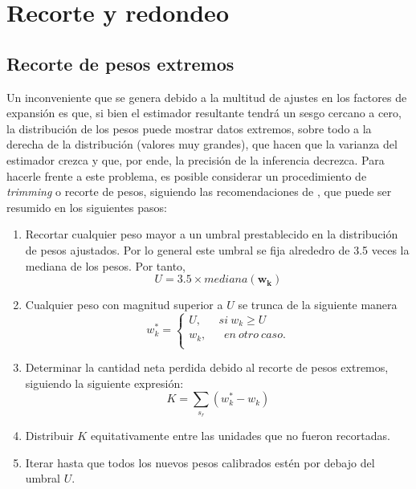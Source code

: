 \documentclass[
  12pt,
  spanish,
]{book}
\providecommand{\tightlist}{%
  \setlength{\itemsep}{0pt}\setlength{\parskip}{0pt}}
\begin{document}
\hypertarget{recorte-y-redondeo}{%
\section{Recorte y redondeo}\label{recorte-y-redondeo}}

\hypertarget{recorte-de-pesos-extremos}{%
\subsection{Recorte de pesos extremos}\label{recorte-de-pesos-extremos}}

Un inconveniente que se genera debido a la multitud de ajustes en los factores de expansión es que, si bien el estimador resultante tendrá un sesgo cercano a cero, la distribución de los pesos puede mostrar datos extremos, sobre todo a la derecha de la distribución (valores muy grandes), que hacen que la varianza del estimador crezca y que, por ende, la precisión de la inferencia decrezca. Para hacerle frente a este problema, es posible considerar un procedimiento de \emph{trimming} o recorte de pesos, siguiendo las recomendaciones de \citet[sec.~14.4]{Valliant_Dever_Kreuter_2018}, que puede ser resumido en los siguientes pasos:

\begin{enumerate}
\def\labelenumi{\arabic{enumi}.}
\tightlist
\item
  Recortar cualquier peso mayor a un umbral prestablecido en la distribución de pesos ajustados. Por lo general este umbral se fija alrededro de 3.5 veces la mediana de los pesos. Por tanto,
  \[
  U=3.5\times mediana(\mathbf{w_{k}})
  \]
\item
  Cualquier peso con magnitud superior a \(U\) se trunca de la siguiente manera
  \[
  w_k^\ast=\left\{\begin{matrix}U,\ \ \ \ \ \ \ si\ w_{k}\geq U\\
  w_{k},\ \ \ \ \ \ \ en\ otro\ caso.\\\end{matrix}\right.
  \]
\item
  Determinar la cantidad neta perdida debido al recorte de pesos extremos, siguiendo la siguiente expresión:
  \[
  K=\sum_{s_r}(w_k^\ast - w_{k})
  \]
\item
  Distribuir \(K\) equitativamente entre las unidades que no fueron recortadas.
\item
  Iterar hasta que todos los nuevos pesos calibrados estén por debajo del umbral \(U\).
\end{enumerate}
\end{document}
